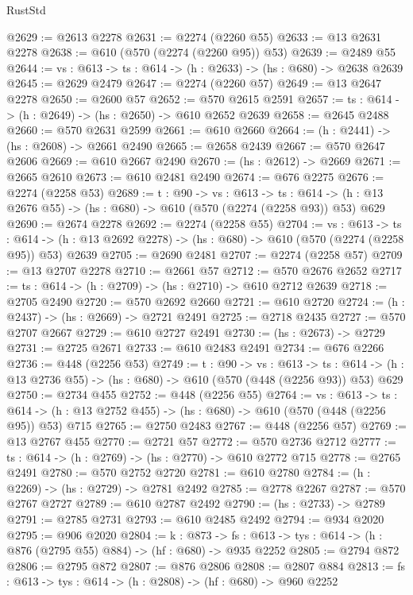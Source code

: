 \begin{lexlean}{RustStd}
\begin{coremodule}
@2629 := @2613 @2278
@2631 := @2274 (@2260 @55)
@2633 := @13 @2631 @2278
@2638 := @610 (@570 (@2274 (@2260 @95)) @53)
@2639 := @2489 @55
@2644 := {vs : @613} -> {ts : @614} -> (h : @2633) -> (hs : @680) -> @2638 @2639
@2645 := @2629 @2479
@2647 := @2274 (@2260 @57)
@2649 := @13 @2647 @2278
@2650 := @2600 @57
@2652 := @570 @2615 @2591
@2657 := {ts : @614} -> (h : @2649) -> (hs : @2650) -> @610 @2652 @2639
@2658 := @2645 @2488
@2660 := @570 @2631 @2599
@2661 := @610 @2660
@2664 := (h : @2441) -> (hs : @2608) -> @2661 @2490
@2665 := @2658 @2439
@2667 := @570 @2647 @2606
@2669 := @610 @2667 @2490
@2670 := (hs : @2612) -> @2669
@2671 := @2665 @2610
@2673 := @610 @2481 @2490
@2674 := @676 @2275
@2676 := @2274 (@2258 @53)
@2689 := {t : @90} ->
  {vs : @613} ->
  {ts : @614} -> (h : @13 @2676 @55) -> (hs : @680) -> @610 (@570 (@2274 (@2258 @93)) @53) @629
@2690 := @2674 @2278
@2692 := @2274 (@2258 @55)
@2704 := {vs : @613} ->
  {ts : @614} -> (h : @13 @2692 @2278) -> (hs : @680) -> @610 (@570 (@2274 (@2258 @95)) @53) @2639
@2705 := @2690 @2481
@2707 := @2274 (@2258 @57)
@2709 := @13 @2707 @2278
@2710 := @2661 @57
@2712 := @570 @2676 @2652
@2717 := {ts : @614} -> (h : @2709) -> (hs : @2710) -> @610 @2712 @2639
@2718 := @2705 @2490
@2720 := @570 @2692 @2660
@2721 := @610 @2720
@2724 := (h : @2437) -> (hs : @2669) -> @2721 @2491
@2725 := @2718 @2435
@2727 := @570 @2707 @2667
@2729 := @610 @2727 @2491
@2730 := (hs : @2673) -> @2729
@2731 := @2725 @2671
@2733 := @610 @2483 @2491
@2734 := @676 @2266
@2736 := @448 (@2256 @53)
@2749 := {t : @90} ->
  {vs : @613} ->
  {ts : @614} -> (h : @13 @2736 @55) -> (hs : @680) -> @610 (@570 (@448 (@2256 @93)) @53) @629
@2750 := @2734 @455
@2752 := @448 (@2256 @55)
@2764 := {vs : @613} ->
  {ts : @614} -> (h : @13 @2752 @455) -> (hs : @680) -> @610 (@570 (@448 (@2256 @95)) @53) @715
@2765 := @2750 @2483
@2767 := @448 (@2256 @57)
@2769 := @13 @2767 @455
@2770 := @2721 @57
@2772 := @570 @2736 @2712
@2777 := {ts : @614} -> (h : @2769) -> (hs : @2770) -> @610 @2772 @715
@2778 := @2765 @2491
@2780 := @570 @2752 @2720
@2781 := @610 @2780
@2784 := (h : @2269) -> (hs : @2729) -> @2781 @2492
@2785 := @2778 @2267
@2787 := @570 @2767 @2727
@2789 := @610 @2787 @2492
@2790 := (hs : @2733) -> @2789
@2791 := @2785 @2731
@2793 := @610 @2485 @2492
@2794 := @934 @2020
@2795 := @906 @2020
@2804 := {k : @873} ->
  {fs : @613} -> {tys : @614} -> (h : @876 (@2795 @55) @884) -> (hf : @680) -> @935 @2252
@2805 := @2794 @872
@2806 := @2795 @872
@2807 := @876 @2806
@2808 := @2807 @884
@2813 := {fs : @613} -> {tys : @614} -> (h : @2808) -> (hf : @680) -> @960 @2252

\end{coremodule}
\end{lexlean}
